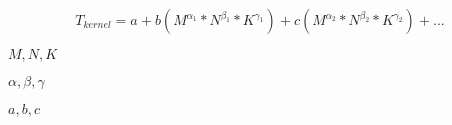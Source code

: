 \documentclass{article}
\begin{document}
\[ T_{kernel} = a + b(M^{\alpha_1} * N^{\beta_1} * K^{\gamma_1}) + c(M^{\alpha_2} * N^{\beta_2} * K^{\gamma_2}) + ... \]
\pagebreak

$M, N, K$
\pagebreak

$\alpha, \beta, \gamma$
\pagebreak

$a, b, c$
\pagebreak
\end{document}
